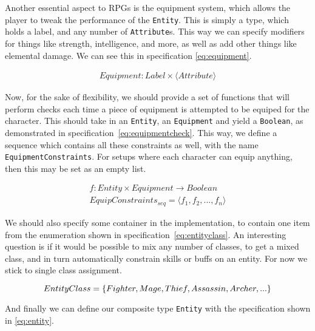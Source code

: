 Another essential aspect to RPGs is the equipment system, which allows the
player to tweak the performance of the \texttt{Entity}. This is simply a type,
which holds a label, and any number of \texttt{Attribute}s. This way we can
specify modifiers for things like strength, intelligence, and more, as well as
add other things like elemental damage. We can see this in specification
\ref{eq:equipment}.

\begin{equation}
\begin{split}
  \label{eq:equipment}
  Equipment\colon Label \times \langle Attribute \rangle
\end{split}
\end{equation}

Now, for the sake of flexibility, we should provide a set of functions that will
perform checks each time a piece of equipment is attempted to be equiped for the
character. This should take in an \texttt{Entity}, an \texttt{Equipment} and
yield a \texttt{Boolean}, as demonstrated in
specification~\ref{eq:equipmentcheck}. This way, we define a sequence which
contains all these constraints as well, with the name
\texttt{EquipmentConstraints}. For setups where each character can equip
anything, then this may be set as an empty list.

\begin{equation}
\begin{split}
  \label{eq:equipmentcheck}
  f\colon Entity \times Equipment \to Boolean \\
  EquipConstraints_{seq} = \langle f_1, f_2, ..., f_n \rangle
\end{split}
\end{equation}

We should also specify some container in the implementation, to contain one item
from the enumeration shown in specification~\ref{eq:entityclass}. An interesting
question is if it would be possible to mix any number of classes, to get a mixed
class, and in turn automatically constrain skills or buffs on an entity. For now
we stick to single class assignment.

\begin{equation}
  \label{eq:entityclass}
  EntityClass = \{ Fighter, Mage, Thief, Assassin, Archer, ... \} \\
\end{equation}

And finally we can define our composite type \texttt{Entity} with the
specification shown in \ref{eq:entity}.

